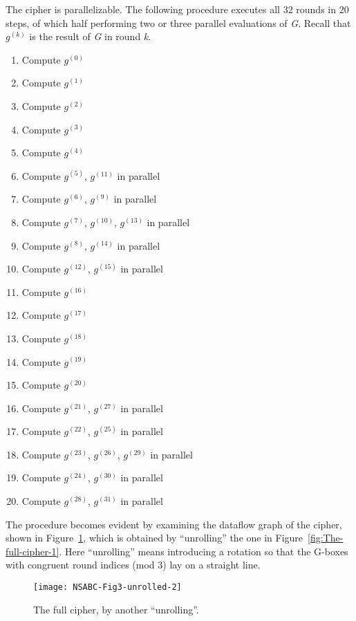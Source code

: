 \documentclass[a4paper,oneside,english]{amsart}
\numberwithin{equation}{section}
\numberwithin{figure}{section}
\begin{document}
The cipher is parallelizable. The following procedure executes all
32 rounds in 20 steps, of which half performing two or three parallel
evaluations of \emph{G}. Recall that $g^{(k)}$ is the result of \emph{G}
in round \emph{k}.
\begin{enumerate}
\item Compute $g^{(0)}$
\item Compute $g^{(1)}$
\item Compute $g^{(2)}$
\item Compute $g^{(3)}$
\item Compute $g^{(4)}$
\item Compute $g^{(5)}$, $g^{(11)}$ in parallel
\item Compute $g^{(6)}$, $g^{(9)}$ in parallel
\item Compute $g^{(7)}$, $g^{(10)}$, $g^{(13)}$ in parallel
\item Compute $g^{(8)}$, $g^{(14)}$ in parallel
\item Compute $g^{(12)}$, $g^{(15)}$ in parallel
\item Compute $g^{(16)}$
\item Compute $g^{(17)}$
\item Compute $g^{(18)}$
\item Compute $g^{(19)}$
\item Compute $g^{(20)}$
\item Compute $g^{(21)}$, $g^{(27)}$ in parallel
\item Compute $g^{(22)}$, $g^{(25)}$ in parallel
\item Compute $g^{(23)}$, $g^{(26)}$, $g^{(29)}$ in parallel
\item Compute $g^{(24)}$, $g^{(30)}$ in parallel
\item Compute $g^{(28)}$, $g^{(31)}$ in parallel
\end{enumerate}
The procedure becomes evident by examining the dataflow graph of the
cipher, shown in Figure~\ref{fig:The-full-cipher-2}, which is obtained
by {}``unrolling'' the one in Figure~\ref{fig:The-full-cipher-1}.
Here {}``unrolling'' means introducing a rotation so that the G-boxes
with congruent round indices (mod 3) lay on a straight line.

\begin{figure}
\texttt{[image: NSABC-Fig3-unrolled-2]}

\caption{\label{fig:The-full-cipher-2}The full cipher, by another {}``unrolling''.}


\end{figure}
\end{document}
